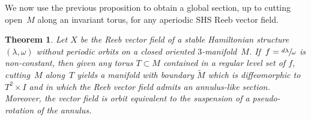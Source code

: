 \documentclass[10pt]{amsart}
\newcommand{\threemanifold}{$3$\nobreakdash-mani\-fold\xspace}
\newtheorem{theorem}{Theorem}[section]
\theoremstyle{definition}
\begin{document}
We now use the previous proposition to obtain a global section, up to cutting open~$M$ along an invariant torus, for any aperiodic SHS Reeb vector field.\enlargethispage{\baselineskip}%

\begin{theorem}\label{thm:SHSannulus}
Let $X$ be the Reeb vector field of a stable Hamiltonian structure $(\lambda,\omega)$ without periodic orbits on a closed oriented \threemanifold~$M$. If~$f=\sfrac{d\lambda}{\omega}$ is non-constant, then given any torus $T\subset M$ contained in a regular level set of $f$, cutting~$M$ along~$T$ yields a manifold with boundary $\widetilde M$ which is diffeomorphic to $T^2\times I$ and in which the Reeb vector field admits an annulus-like section. Moreover, the vector field is orbit equivalent to the suspension of a pseudo-rotation of the annulus.
\end{theorem}
\end{document}
